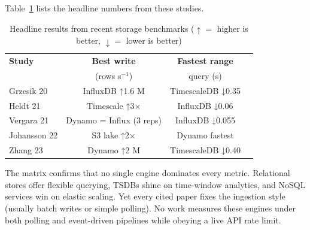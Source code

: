\documentclass[nomenclature, english, biblatex]{kththesis}
\numberwithin{listing}{chapter}
\begin{document}
\noindent
Table~\ref{tab:storage-matrix} lists the headline numbers from these studies.


\begin{table}[H]
 \centering
 \begin{threeparttable}
 \caption{Headline results from recent storage benchmarks
 (\(\uparrow\!=\) higher is better,\; \(\downarrow\!=\) lower is better)}
 \label{tab:storage-matrix}
 \begin{tabularx}{\linewidth}{@{} l c c c @{}}
 \toprule
 \textbf{Study} & \textbf{Best write} & \textbf{Fastest range} \\[-2pt]
 & (rows s\(^{-1}\)) & query (s) & \\
 \midrule
 Grzesik 20\tnote{a} & InfluxDB ↑1.6 M & TimescaleDB ↓0.35 \\[2pt]
 Heldt 21\tnote{b} & Timescale ↑3× & InfluxDB ↓0.06 \\[2pt]
 Vergara 21\tnote{c} & Dynamo = Influx (3 reps) & InfluxDB ↓0.055 \\[2pt]
 Johansson 22\tnote{d}& S3 lake ↑2× & Dynamo fastest \\[2pt]
 Zhang 23\tnote{e} & Dynamo ↑2 M & TimescaleDB ↓0.40 \\
 \bottomrule
 \end{tabularx}
 \end{threeparttable}
\end{table}


\noindent
The matrix confirms that no single engine dominates every metric. 
Relational stores offer flexible querying, \glspl{TSDB} shine on time-window analytics, and NoSQL services win on elastic scaling. 
Yet every cited paper fixes the ingestion style (usually batch writes or simple polling). No work measures these engines under both polling and event-driven pipelines while obeying a live API rate limit. 
\end{document}
